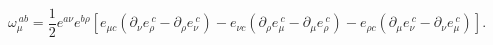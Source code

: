 \begin{equation}
\omega_\mu^{\ ab}=\frac{1}{2}e^{a\nu}e^{b\rho}\left[
e_{\mu c}(\partial_\nu e_\rho^{\ c}-\partial_\rho e_\nu^{\ c})-
e_{\nu c}(\partial_\rho e_\mu^{\ c}-\partial_\mu e_\rho^{\ c})-
e_{\rho c}(\partial_\mu e_\nu^{\ c}-\partial_\nu e_\mu^{\ c})\right].
\label{omegae}
\end{equation}

